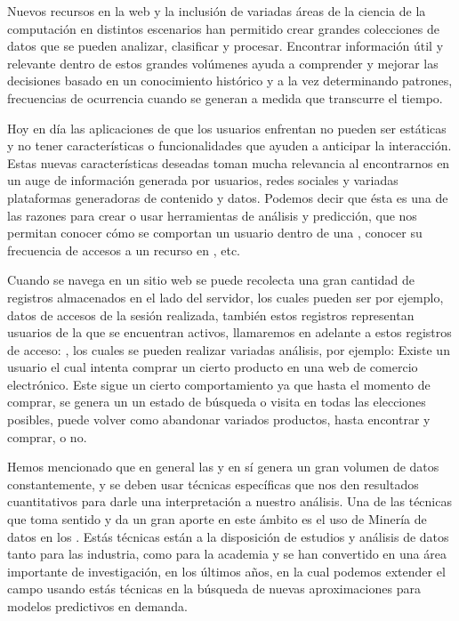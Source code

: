 Nuevos recursos en la web y la inclusión de variadas áreas de la ciencia de la computación	en distintos escenarios han permitido crear grandes colecciones de datos que se pueden analizar, clasificar y procesar. Encontrar información útil y relevante dentro de estos grandes volúmenes ayuda a comprender y mejorar las decisiones basado en un conocimiento histórico  y a la vez determinando patrones, frecuencias de ocurrencia cuando se generan a medida que transcurre el tiempo. 


Hoy en día las aplicaciones de \inet que los usuarios enfrentan no pueden ser estáticas y no tener características o funcionalidades que ayuden a anticipar la interacción. Estas nuevas características deseadas toman mucha relevancia al encontrarnos en un auge de información generada por usuarios, redes sociales y variadas plataformas generadoras de contenido y datos. Podemos decir que ésta es una de las razones para  crear o usar  herramientas de análisis y predicción, que nos permitan conocer cómo se comportan un usuario  dentro de una \web, conocer su frecuencia de accesos a un recurso en \inet, etc.\par

Cuando se navega en un sitio web se puede recolecta una gran cantidad de registros almacenados en el lado del servidor, los cuales pueden ser por ejemplo, datos de accesos de la sesión realizada, también estos  registros representan usuarios de la \web  que se encuentran activos, llamaremos en adelante a estos registros de acceso: \webasccesslog,   los cuales se pueden realizar variadas análisis, por ejemplo:  Existe un usuario el cual intenta comprar un cierto producto en una web de comercio electrónico. Este sigue un cierto comportamiento ya que hasta el momento de comprar, se genera un un estado de búsqueda o visita en todas las elecciones posibles, puede volver como abandonar variados productos, hasta encontrar y comprar, o no. 

Hemos mencionado  que  en general las \webs y en sí \inet genera un gran volumen de datos constantemente, y se deben usar técnicas específicas que nos den resultados cuantitativos para darle una interpretación a nuestro análisis. Una de las técnicas que toma sentido y da un gran aporte en este ámbito es el uso de Minería de datos  en los \webasccesslog.  Estás técnicas están a la disposición  de estudios y análisis de datos tanto para las industria, como para la academia y  se han convertido en una área importante  de investigación, en los últimos años, en la cual podemos extender el campo usando estás técnicas en la búsqueda de nuevas aproximaciones para modelos predictivos en demanda. 




